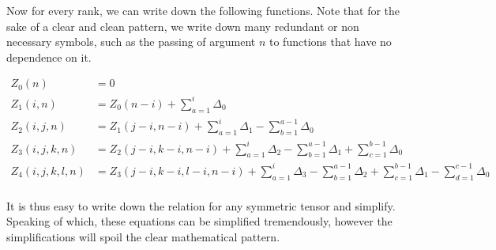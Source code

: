 \documentclass{article}
\begin{document}
Now for every rank, we can write down the following functions.
Note that for the sake of a clear and clean pattern, we write down many redundant or non necessary symbols, such as the passing of argument $n$ to functions that have no dependence on it.

\begin{align*}
Z_0(n)& = 0 \\
Z_1(i,n)& = Z_0(n-i) + \sum_{a=1}^{i} \Delta_0  \\
Z_2(i,j,n)& = Z_1(j-i,n-i) + \sum_{a=1}^{i} \Delta_1 - \sum_{b=1}^{a-1} \Delta_0  \\
Z_3(i,j,k,n)& = Z_2(j-i,k-i,n-i) + \sum_{a=1}^{i} \Delta_2 - \sum_{b=1}^{a-1} \Delta_1 + \sum_{c=1}^{b-1} \Delta_0  \\
Z_4(i,j,k,l,n)& = Z_3(j-i,k-i,l-i,n-i) + \sum_{a=1}^{i} \Delta_3 - \sum_{b=1}^{a-1} \Delta_2 + \sum_{c=1}^{b-1} \Delta_1  - \sum_{d=1}^{c-1} \Delta_0  \\
\end{align*}

It is thus easy to write down the relation for any symmetric tensor and simplify. 
Speaking of which, these equations can be simplified tremendously, however the simplifications will spoil the clear mathematical pattern.
\end{document}
